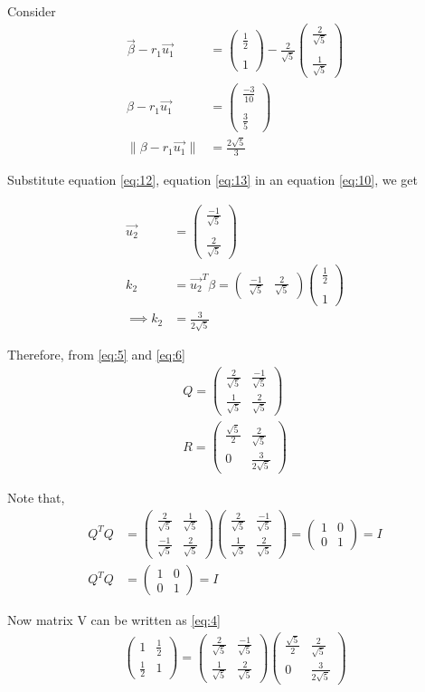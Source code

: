 \documentclass[journal,12pt,twocolumn]{IEEEtran}
\newcommand{\myvec}[1]{\ensuremath{\begin{pmatrix}#1\end{pmatrix}}}
\begin{document}
Consider
\begin{align}
    \vec{\beta}-r_1\vec{u_1}&=\myvec{\frac{1}{2} \\\\ 1}-\frac{2}{\sqrt{5}}\myvec{\frac{2}{\sqrt{5}} \\\\ \frac{1}{\sqrt{5}}}\\
\beta-r_1\vec{u_1}&=\myvec{\frac{-3}{10} \\\\ \frac{3}{5}} \label{eq:12}\\
\| \beta-r_1\vec{u_1} \|&=\frac{{2\sqrt{5}}}{3} \label{eq:13}
\end{align}

Substitute equation \eqref{eq:12}, equation \eqref{eq:13} in an equation \eqref{eq:10}, we get

\begin{align}
    \vec{u_2}&=\myvec{\frac{-1}{\sqrt{5}} \\\\ \frac{2}{\sqrt{5}}}\\
    k_2&=\vec{u_2}^T\beta=\myvec{\frac{-1}{\sqrt{5}} & \frac{2}{\sqrt{5}}}\myvec{\frac{1}{2} \\\\ 1}\\
    \implies k_2&=\frac{3}{2\sqrt{5}}
\end{align}

Therefore, from \eqref{eq:5} and \eqref{eq:6}
\begin{align}
    Q=\myvec{\frac{2}{\sqrt{5}} & \frac{-1}{\sqrt{5}} \\ \frac{1}{\sqrt{5}} & \frac{2}{\sqrt{5}}}\\
    R=\myvec{\frac{\sqrt{5}}{2} & \frac{2}{\sqrt{5}} \\ 0 & \frac{3}{2\sqrt{5}}}
\end{align}

Note that,
\begin{align}
    Q^TQ&=\myvec{\frac{2}{\sqrt{5}} & \frac{1}{\sqrt{5}} \\ \frac{-1}{\sqrt{5}} & \frac{2}{\sqrt{5}}}\myvec{\frac{2}{\sqrt{5}} & \frac{-1}{\sqrt{5}} \\ \frac{1}{\sqrt{5}} & \frac{2}{\sqrt{5}}}=\myvec{1 & 0\\ 0 & 1}=I\\
Q^TQ&=\myvec{1 & 0\\ 0 & 1}=I
\end{align}

Now matrix V can be written as \eqref{eq:4}
\begin{align}
    \myvec{1 & \frac{1}{2} \\ \frac{1}{2} & 1}=\myvec{\frac{2}{\sqrt{5}} & \frac{-1}{\sqrt{5}} \\ \frac{1}{\sqrt{5}} & \frac{2}{\sqrt{5}}}\myvec{\frac{\sqrt{5}}{2} & \frac{2}{\sqrt{5}} \\ 0 & \frac{3}{2\sqrt{5}}}
\end{align}
\end{document}
